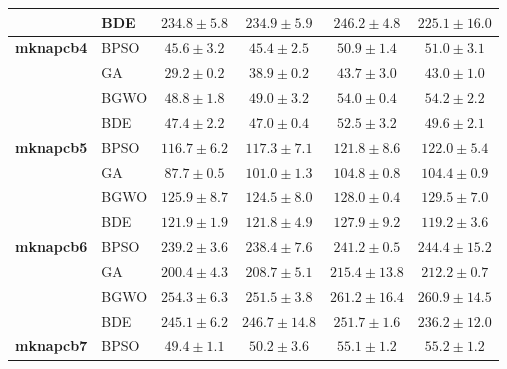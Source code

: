 \begin{table}[htbp]
\begin{tabular*}{\textwidth}{@{\extracolsep{\fill}}llcccc@{}}
                       & BDE   &          $234.8 \pm 5.8$ &          $234.9 \pm 5.9$ &          $246.2 \pm 4.8$ & $\mathbf{225.1 \pm 16.0}$ \\
    \midrule
    \textbf{mknapcb4}  & BPSO  &           $45.6 \pm 3.2$ &  $\mathbf{45.4 \pm 2.5}$ &           $50.9 \pm 1.4$ &           $51.0 \pm 3.1$ \\
                       & GA    &  $\mathbf{29.2 \pm 0.2}$ &           $38.9 \pm 0.2$ &           $43.7 \pm 3.0$ &           $43.0 \pm 1.0$ \\
                       & BGWO  &  $\mathbf{48.8 \pm 1.8}$ &           $49.0 \pm 3.2$ &           $54.0 \pm 0.4$ &           $54.2 \pm 2.2$ \\
                       & BDE   &           $47.4 \pm 2.2$ &  $\mathbf{47.0 \pm 0.4}$ &           $52.5 \pm 3.2$ &           $49.6 \pm 2.1$ \\
    \midrule
    \textbf{mknapcb5}  & BPSO  & $\mathbf{116.7 \pm 6.2}$ &          $117.3 \pm 7.1$ &          $121.8 \pm 8.6$ &          $122.0 \pm 5.4$ \\
                       & GA    &  $\mathbf{87.7 \pm 0.5}$ &          $101.0 \pm 1.3$ &          $104.8 \pm 0.8$ &          $104.4 \pm 0.9$ \\
                       & BGWO  &          $125.9 \pm 8.7$ & $\mathbf{124.5 \pm 8.0}$ &          $128.0 \pm 0.4$ &          $129.5 \pm 7.0$ \\
                       & BDE   &          $121.9 \pm 1.9$ &          $121.8 \pm 4.9$ &          $127.9 \pm 9.2$ & $\mathbf{119.2 \pm 3.6}$ \\
    \midrule
    \textbf{mknapcb6}  & BPSO  &          $239.2 \pm 3.6$ & $\mathbf{238.4 \pm 7.6}$ &          $241.2 \pm 0.5$ &         $244.4 \pm 15.2$ \\
                       & GA    & $\mathbf{200.4 \pm 4.3}$ &          $208.7 \pm 5.1$ &         $215.4 \pm 13.8$ &          $212.2 \pm 0.7$ \\
                       & BGWO  &          $254.3 \pm 6.3$ & $\mathbf{251.5 \pm 3.8}$ &         $261.2 \pm 16.4$ &         $260.9 \pm 14.5$ \\
                       & BDE   &          $245.1 \pm 6.2$ &         $246.7 \pm 14.8$ &          $251.7 \pm 1.6$ & $\mathbf{236.2 \pm 12.0}$ \\
    \midrule
    \textbf{mknapcb7}  & BPSO  &  $\mathbf{49.4 \pm 1.1}$ &           $50.2 \pm 3.6$ &           $55.1 \pm 1.2$ &           $55.2 \pm 1.2$ \\

\end{tabular*}
\end{table}
